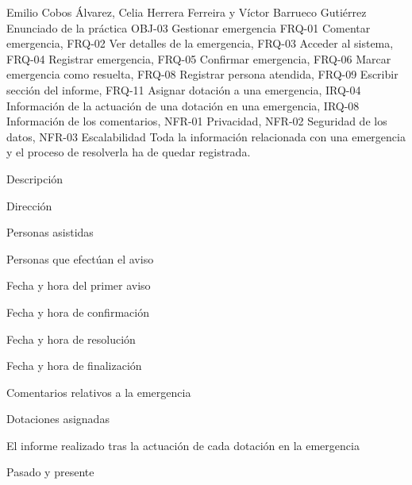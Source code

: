 {Emilio Cobos Álvarez, Celia Herrera Ferreira y Víctor Barrueco Gutiérrez}
{Enunciado de la práctica}
{OBJ-03 Gestionar emergencia}
{FRQ-01 Comentar emergencia, FRQ-02 Ver detalles de la emergencia, FRQ-03 Acceder al sistema, FRQ-04 Registrar emergencia, FRQ-05 Confirmar emergencia, FRQ-06 Marcar emergencia como resuelta, FRQ-08 Registrar persona atendida, FRQ-09 Escribir sección del informe, FRQ-11 Asignar dotación a una emergencia, IRQ-04 Información de la actuación de una dotación en una emergencia, IRQ-08 Información de los comentarios, NFR-01 Privacidad, NFR-02 Seguridad de los datos, NFR-03 Escalabilidad}
{Toda la información relacionada con una emergencia y el proceso de resolverla ha de quedar registrada.}
{
\item{Descripción}
\item{Dirección}
\item{Personas asistidas}
\item{Personas que efectúan el aviso}
\item{Fecha y hora del primer aviso}
\item{Fecha y hora de confirmación}
\item{Fecha y hora de resolución}
\item{Fecha y hora de finalización}
\item{Comentarios relativos a la emergencia}
\item{Dotaciones asignadas}
\item{El informe realizado tras la actuación de cada dotación en la emergencia}
}
{Pasado y presente}

